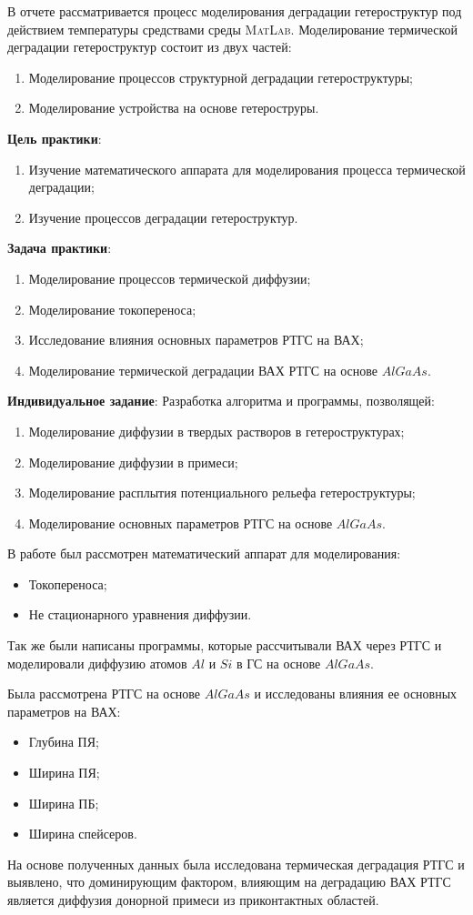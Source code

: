 \Conclusion
В отчете рассматривается процесс моделирования деградации гетероструктур под действием температуры средствами среды \textsc{MatLab}. Моделирование термической деградации гетероструктур состоит из двух частей:
\begin{enumerate}
	\item Моделирование процессов структурной деградации гетероструктуры;
	\item Моделирование устройства на основе гетероструры.
\end{enumerate}
\textbf{Цель практики}:
\begin{enumerate}
	\item Изучение математического аппарата для моделирования процесса термической деградации;
	\item Изучение процессов деградации гетероструктур.
\end{enumerate}

\textbf{Задача практики}:
\begin{enumerate}
	\item Моделирование процессов термической диффузии;
	\item Моделирование токопереноса;
	\item Исследование влияния основных параметров РТГС на ВАХ;
	\item Моделирование термической деградации ВАХ РТГС на основе $AlGaAs$.
\end{enumerate}

\textbf{Индивидуальное задание}: Разработка алгоритма и программы, позволящей:
\begin{enumerate}
	\item Моделирование диффузии в твердых растворов в гетероструктурах;
	\item Моделирование диффузии в примеси;
	\item Моделирование расплытия потенциального рельефа гетероструктуры;
	\item Моделирование основных параметров РТГС на основе $AlGaAs$.
\end{enumerate}


В работе был рассмотрен математический аппарат для моделирования:
\begin{itemize}
	\item Токопереноса;
	\item Не стационарного уравнения диффузии.
\end{itemize}
Так же были написаны программы, которые рассчитывали ВАХ через РТГС и моделировали диффузию атомов $Al$ и $Si$ в ГС на основе $AlGaAs$.

Была рассмотрена РТГС на основе $AlGaAs$ и исследованы влияния ее основных параметров на ВАХ:
\begin{itemize}
	\item Глубина ПЯ;
	\item Ширина ПЯ;
	\item Ширина ПБ;
	\item Ширина спейсеров.
\end{itemize}

На основе полученных данных была исследована термическая деградация РТГС и выявлено, что доминирующим фактором, влияющим на деградацию ВАХ РТГС является диффузия донорной примеси из приконтактных областей.